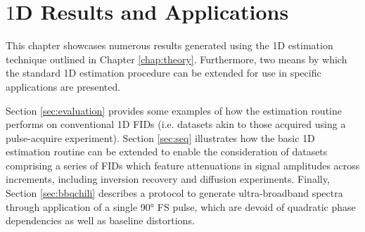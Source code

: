 \chapter{$1$D Results and Applications}
\label{chap:results}

This chapter showcases numerous results generated using the \ac{1D} estimation
technique outlined in Chapter \ref{chap:theory}. Furthermore, two means by
which the standard \ac{1D} estimation procedure can be extended for use in
specific applications are presented.

Section \ref{sec:evaluation} provides some examples of how the estimation
routine performs on conventional \ac{1D} \acp{FID} (i.e. datasets akin to those
acquired using a pulse-acquire experiment). Section \ref{sec:seq} illustrates
how the basic \ac{1D} estimation routine can be extended to enable the
consideration of datasets comprising a series of \acp{FID} which
feature attenuations in signal amplitudes across increments, including inversion
recovery and diffusion experiments. Finally, Section \ref{sec:bbqchili}
describes a protocol to generate ultra-broadband spectra through application of
a single \ang{90} \acl{FS} pulse, which are devoid of quadratic phase
dependencies as well as baseline distortions.




